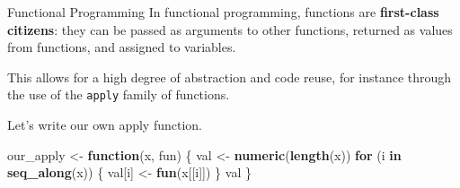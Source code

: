 \documentclass[
  ignorenonframetext,
  aspectratio=1610,
  onlytextwidth]{beamer}
\newenvironment{Shaded}{\begin{snugshade}}{\end{snugshade}}
\newcommand{\ControlFlowTok}[1]{\textcolor[rgb]{0.13,0.29,0.53}{\textbf{#1}}}
\newcommand{\FunctionTok}[1]{\textcolor[rgb]{0.13,0.29,0.53}{\textbf{#1}}}
\newcommand{\NormalTok}[1]{#1}
\newcommand{\OtherTok}[1]{\textcolor[rgb]{0.56,0.35,0.01}{#1}}
\begin{document}
\begin{frame}[fragile]{Functional Programming}
\label{functional-programming}
In functional programming, functions are \textbf{first-class citizens}:
they can be passed as arguments to other functions, returned as values
from functions, and assigned to variables.

\bigskip

\pause

This allows for a high degree of abstraction and code reuse, for
instance through the use of the \texttt{apply} family of functions.

\pause

Let's write our own apply function.

\bigskip

\begin{Shaded}
\begin{Highlighting}[]
\NormalTok{our\_apply }\OtherTok{\textless{}{-}} \ControlFlowTok{function}\NormalTok{(x, fun) \{}
\NormalTok{  val }\OtherTok{\textless{}{-}} \FunctionTok{numeric}\NormalTok{(}\FunctionTok{length}\NormalTok{(x))}
  \ControlFlowTok{for}\NormalTok{ (i }\ControlFlowTok{in} \FunctionTok{seq\_along}\NormalTok{(x)) \{}
\NormalTok{    val[i] }\OtherTok{\textless{}{-}} \FunctionTok{fun}\NormalTok{(x[[i]])}
\NormalTok{  \}}
\NormalTok{  val}
\NormalTok{\}}
\end{Highlighting}
\end{Shaded}
\end{frame}
\end{document}
